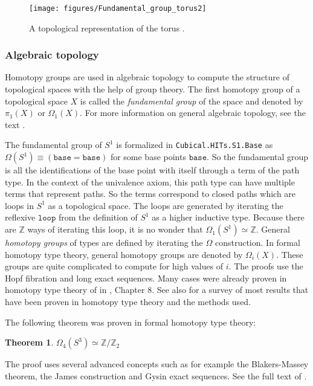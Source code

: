 \documentclass[12pt,a4paper,twoside,xetex,draft]{book}
\newcommand{\keyword}[1]{\emph{#1}\index{#1}}
\newtheorem{theorem}{Theorem}[section]
\newcommand{\op}[1]{\mathtt{#1}}
\begin{document}
\begin{figure}
\centering
\texttt{[image: figures/Fundamental\_group\_torus2]}
\caption{A topological representation of the torus \cite{Dinkelbach2005}. \label{torus}}
\end{figure}

\subsubsection{Algebraic topology}\label{higherhomotopy}

Homotopy groups are used in algebraic topology to compute the structure of topological spaces with the help of group theory.  The first homotopy group of a topological space $X$ is called the \keyword{fundamental group} of the space and denoted by $\pi_1 (X)$ or $\Omega_1 (X)$. For more information on general algebraic topology, see the text \cite{Hatcher2001}.

The fundamental group of $S^1$ is formalized in \texttt{Cubical.HITs.S1.Base} as $\Omega (S^1) \equiv (\op{base} = \op{base})$ for some base points $\op{base}$. So the fundamental group is all the identifications of the base point with itself through a term of the path type. In the context of the univalence axiom, this path type can have multiple terms that represent paths. So the terms correspond to closed paths which are loops in $S^1$ as a topological space. The loops are generated by iterating the reflexive $\op{loop}$ from the definition of $S^1$ as a higher inductive type. Because there are $\mathbb{Z}$ ways of iterating this loop, it is no wonder that $\Omega_1 (S^1) \simeq \mathbb{Z}$. General \keyword{homotopy groups} of types are defined by iterating the $\Omega$ construction. In formal homotopy type theory, general homotopy groups are denoted by $\Omega_i (X)$. These groups are quite complicated to compute for high values of $i$. The proofs use the Hopf fibration and long exact sequences. Many cases were already proven in homotopy type theory of in \cite{Voevodsky2013}, Chapter 8. See also \cite{Licata2013May} for a survey of most results that have been proven in homotopy type theory and the methods used.



The following theorem was proven in formal homotopy type theory:

\begin{theorem}
$\Omega_4 ( S^3 ) \simeq \mathbb{Z} / \mathbb{Z}_2$
\end{theorem}

The proof uses several advanced concepts such as for example the Blakers-Massey theorem, the James construction and Gysin exact sequences. See the full text of \cite{Brunerie2016}.
\end{document}
